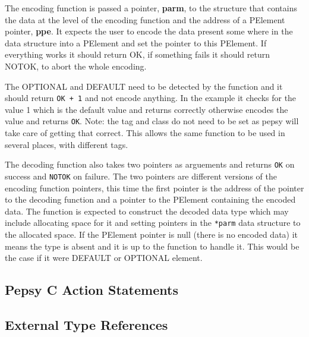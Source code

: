
The encoding function is passed a pointer, {\bf parm},
to the structure that contains
the data at the level of the encoding function and the address of a PElement
pointer, {\bf ppe}.
It expects the user to encode the data present some where in the data
structure into a PElement and set the pointer to this PElement.
If everything works it should return OK, if something fails it should
return NOTOK, to abort the whole encoding.

The OPTIONAL and DEFAULT need to be detected by the function and it should
return \verb"OK + 1" and not encode anything.
In the example it checks for the value 1 which is the default value
and returns correctly otherwise encodes the value and returns \verb"OK".
Note: the tag and class do not need to be set as pepsy will take care
of getting that correct.
This allows the same function to be used in several places, with different
tags.

The decoding function also takes two pointers as arguements and returns
\verb"OK" on success and \verb"NOTOK" on failure.
The two pointers are different versions of the encoding function pointers,
this time the first pointer is the address of the pointer to the decoding
function and a pointer to the PElement containing the encoded data.
The function is expected to construct the decoded data type which may include
allocating space for it and setting pointers in the \verb"*parm" data
structure to the allocated space.
If the PElement pointer is null (there is no encoded data) it means the
type is absent and it is up to the function to handle it.
This would be the case if it were DEFAULT or OPTIONAL element.


\subsection{Pepsy C Action Statements}

\subsection{External Type References}

